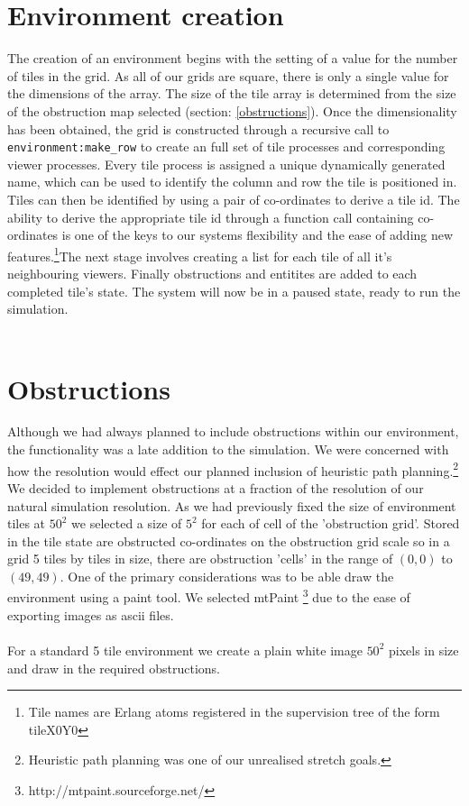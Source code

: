 \documentclass[10pt, a4paper, conference, compsocconf]{IEEEtran}
\begin{document}
\section{Environment creation \label{environment_creation}}
The creation of an environment begins with the setting of a value for the number of tiles in the grid. As all of our grids are square, there is only a single value for the dimensions of the array. The size of the tile array is determined from the size of the obstruction map selected (section: \ref{obstructions}). Once the dimensionality has been obtained, the grid is constructed through a recursive call to \verb+environment:make_row+ to create an full set of tile processes and corresponding viewer processes. Every tile process is assigned a unique dynamically generated name, which can be used to identify the column and row the tile is positioned in. Tiles can then be identified by using a pair of co-ordinates to derive a tile id. The ability to derive the appropriate tile id through a function call containing co-ordinates is one of the keys to our systems flexibility and the ease of adding new features.\footnote{Tile names are Erlang atoms registered in the supervision tree of the form tileX0Y0}The next stage involves creating a list for each tile of all it's neighbouring viewers. Finally obstructions and entitites are added to each completed tile's state. The system will now be in a paused state, ready to run the simulation.\\
\\
\section{Obstructions \label{obstructions}}
Although we had always planned to include obstructions within our environment, the functionality was a late addition to the simulation. We were concerned with how the resolution would effect our planned inclusion of heuristic path planning.\footnote{Heuristic path planning was one of our unrealised stretch goals.} We decided to implement obstructions at a fraction of the resolution of our natural simulation resolution. As we had previously fixed the size of environment tiles at \(50^2\) we selected a size of \(5^2\) for each of cell of the 'obstruction grid'. Stored in the tile state are obstructed co-ordinates on the obstruction grid scale so in a grid 5 tiles by tiles in size, there are obstruction 'cells' in the range of \( (0,0) \) to \( (49,49) \). One of the primary considerations was to be able draw the environment using a paint tool. We selected mtPaint \footnote{http://mtpaint.sourceforge.net/} due to the ease of exporting images as ascii files.\\
\\
For a standard 5 tile environment we create a plain white image \(50^2\) pixels in size and draw in the required obstructions.
\end{document}
